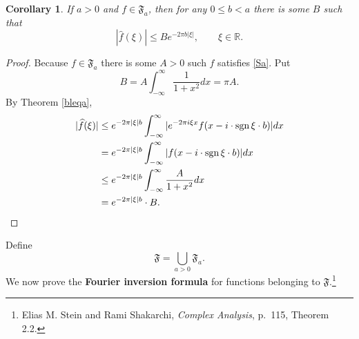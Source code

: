 \documentclass{article}
\newcommand{\sgn}{\ensuremath\mathrm{sgn}\,}
\newtheorem{corollary}[theorem]{Corollary}
\theoremstyle{definition}
\begin{document}
\begin{corollary}
If $a>0$ and $f \in \mathfrak{F}_a$, then for any $0 \leq b < a$ there is some $B$ such that
\[
|\widehat{f}(\xi)| \leq B e^{-2\pi b|\xi|}, \qquad \xi \in \mathbb{R}.
\]
\end{corollary}
\begin{proof}
Because $f \in \mathfrak{F}_a$ there is some $A>0$ such $f$ satisfies \eqref{Sa}. Put
\[
B=A\int_{-\infty}^\infty \frac{1}{1+x^2} dx = \pi A.
\]
By Theorem \ref{bleqa}, 
\begin{align*}
|\widehat{f}(\xi)| &\leq e^{-2\pi |\xi| b} \int_{-\infty}^\infty |e^{-2\pi i\xi x} f(x-i\cdot  \sgn \xi \cdot b)| dx\\
&=e^{-2\pi |\xi| b} \int_{-\infty}^\infty |f(x-i\cdot  \sgn \xi \cdot b)| dx\\
&\leq e^{-2\pi |\xi| b}  \int_{-\infty}^\infty \frac{A}{1+x^2} dx\\
&= e^{-2\pi |\xi| b} \cdot B.
\end{align*}
\end{proof}


Define
\[
\mathfrak{F} = \bigcup_{a>0} \mathfrak{F}_a.
\]
We now prove the \textbf{Fourier inversion formula} for functions belonging to $\mathfrak{F}$.\footnote{Elias M. Stein and Rami Shakarchi, {\em Complex Analysis},
p.~115, Theorem 2.2.}
\end{document}
